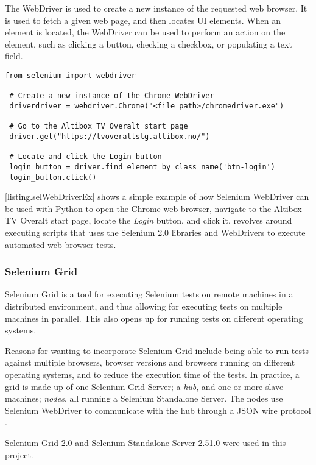 The WebDriver is used to create a new instance of the requested web browser. It is used to fetch a given web page, and then locates UI elements. When an element is located, the WebDriver can be used to perform an action on the element, such as clicking a button, checking a checkbox, or populating a text field.

\vspace{4mm}
\begin{lstlisting}[caption=Selenium WebDriver Example, label={listing.selWebDriverEx}]
 from selenium import webdriver
    
 # Create a new instance of the Chrome WebDriver
 driverdriver = webdriver.Chrome("<file path>/chromedriver.exe")
  
 # Go to the Altibox TV Overalt start page
 driver.get("https://tvoveraltstg.altibox.no/")
  
 # Locate and click the Login button
 login_button = driver.find_element_by_class_name('btn-login')
 login_button.click()
\end{lstlisting}
\noindent
\lstlistingname \space \ref{listing.selWebDriverEx} shows a simple example of how Selenium WebDriver can be used with Python to open the Chrome web browser, navigate to the Altibox TV Overalt start page, locate the \emph{Login} button, and click it. \toolname \space revolves around executing scripts that uses the Selenium 2.0 libraries and WebDrivers to execute automated web browser tests.

\subsubsection{Selenium Grid}\label{subsubsec.seleniumGrid}
Selenium Grid is a tool for executing Selenium tests on remote machines in a distributed environment, and thus allowing for executing tests on multiple machines in parallel. This also opens up for running tests on different operating systems.

Reasons for wanting to incorporate Selenium Grid include being able to run tests against multiple browsers, browser versions and browsers running on different operating systems, and to reduce the execution time of the tests. In practice, a grid is made up of one Selenium Grid Server; a \emph{hub}, and one or more slave machines; \emph{nodes}, all running a Selenium Standalone Server. The nodes use Selenium WebDriver to communicate with the hub through a JSON wire protocol \cite{selGrid}.

Selenium Grid 2.0 and Selenium Standalone Server 2.51.0 were used in this project.

